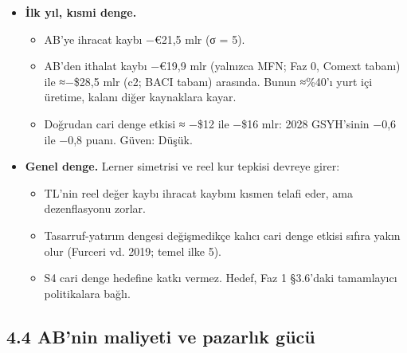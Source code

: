 \begin{itemize}
\tightlist
\item
  \textbf{İlk yıl, kısmi denge.}

  \begin{itemize}
  \tightlist
  \item
    AB'ye ihracat kaybı −€21,5 mlr (σ = 5).
  \item
    AB'den ithalat kaybı −€19,9 mlr (yalnızca MFN; Faz 0, Comext tabanı) ile ≈−\$28,5 mlr (c2; BACI tabanı) arasında. Bunun ≈\%40'ı yurt içi üretime, kalanı diğer kaynaklara kayar.
  \item
    Doğrudan cari denge etkisi ≈ −\$12 ile −\$16 mlr: 2028 GSYH'sinin −0,6 ile −0,8 puanı. \etiketT{} Güven: Düşük.
  \end{itemize}
\item
  \textbf{Genel denge.} Lerner simetrisi ve reel kur tepkisi devreye girer:

  \begin{itemize}
  \tightlist
  \item
    TL'nin reel değer kaybı ihracat kaybını kısmen telafi eder, ama dezenflasyonu zorlar.
  \item
    Tasarruf-yatırım dengesi değişmedikçe kalıcı cari denge etkisi sıfıra yakın olur (Furceri vd. 2019; temel ilke 5).
  \item
    S4 cari denge hedefine katkı vermez. Hedef, Faz 1 §3.6'daki tamamlayıcı politikalara bağlı.
  \end{itemize}
\end{itemize}

\hypertarget{02a_politika_uzayi-44-abnin-maliyeti-ve-pazarlux131k-guxfccuxfc}{%
\subsection{4.4 AB'nin maliyeti ve pazarlık gücü}\label{02a_politika_uzayi-44-abnin-maliyeti-ve-pazarlux131k-guxfccuxfc}}

\begingroup\gbtablo\small

